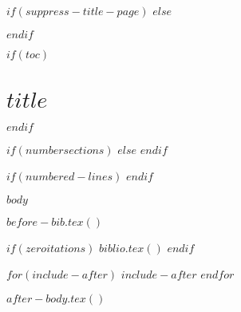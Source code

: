 $if(suppress-title-page)$
$else$
\maketitle
$endif$

$if(toc)$
\hypertarget{toc}{}
\tableofcontents
\newpage
\section[Introduction]{$title$}
$endif$

$if(numbersections)$
\setcounter{secnumdepth}{$if(secnumdepth)$$secnumdepth$$else$5$endif$}
$else$
\setcounter{secnumdepth}{-\maxdimen} %
$endif$

\setlength\LTleft{0pt}

$if(numbered-lines)$
\resetlinenumber[1]
$endif$



$body$

$before-bib.tex()$

$if(zeroitations)$
$biblio.tex()$
$endif$

$for(include-after)$
$include-after$
$endfor$

$after-body.tex()$


